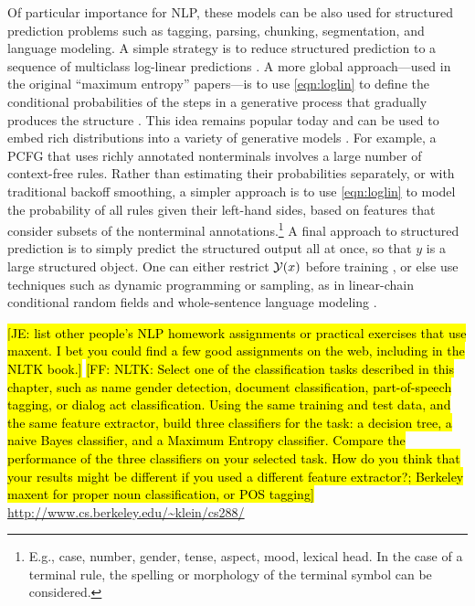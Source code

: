 \documentclass[11pt,letterpaper]{article}
\newcommand{\Note}[1]{}
\renewcommand{\Note}[1]{\hl{[#1]}}  %
\newcommand{\NoteSigned}[3]{{\sethlcolor{#2}\Note{#1: #3}}}
\newcommand{\NoteFF}[1]{\NoteSigned{FF}{LightBlue}{#1}}
\newcommand{\NoteJE}[1]{\NoteSigned{JE}{LightGreen}{#1}}
\begin{document}
Of particular importance for NLP, these models can be also used for
structured prediction problems such as tagging, parsing, chunking,
segmentation, and language modeling.  A simple strategy is to reduce
structured prediction to a sequence of multiclass log-linear
predictions \cite{ratnaparkhi-1998}.  A more global approach---used in
the original ``maximum entropy'' papers---is to use \eqref{eqn:loglin}
to define the conditional probabilities of the steps in a generative
process that gradually produces the structure
\cite{rosenfeld-1994,berger-dellapietra-dellapietra-1996}.  This idea
remains popular today and can be used to embed rich distributions
into a variety of generative models \cite{bergkirkpatrick-et-al-2010}.
For example, a PCFG that uses richly annotated nonterminals involves a
large number of context-free rules.  Rather than estimating their
probabilities separately, or with traditional backoff smoothing, a
simpler approach is to use \eqref{eqn:loglin} to model the probability
of all rules given their left-hand sides, based on features that
consider subsets of the nonterminal annotations.\footnote{E.g., case,
  number, gender, tense, aspect, mood, lexical head.  In the case of a
  terminal rule, the spelling or morphology of the terminal symbol can
  be considered.}  A final approach to structured prediction is to
simply predict the structured output all at once, so that $y$ is a
large structured object. One can either restrict ${\cal Y}(x)$ before training
\cite{johnson-et-al-1999}, or else use techniques such as dynamic
programming or sampling, as in linear-chain conditional random fields
\cite{lafferty-mccallum-pereira-2001} and whole-sentence language
modeling \cite{rosenfeld-chen-zhu-2001}.

\NoteJE{list
  other people's NLP homework assignments or practical exercises that
  use maxent.  I bet you could find a few good assignments on the web,
  including in the NLTK book.}
\NoteFF{NLTK: Select one of the classification tasks described in this chapter, such as name gender detection, document classification, part-of-speech tagging, or dialog act classification. Using the same training and test data, and the same feature extractor, build three classifiers for the task: a decision tree, a naive Bayes classifier, and a Maximum Entropy classifier. Compare the performance of the three classifiers on your selected task. How do you think that your results might be different if you used a different feature extractor?; Berkeley  maxent for proper noun classification, or POS tagging} \url{http://www.cs.berkeley.edu/~klein/cs288/}
\end{document}
